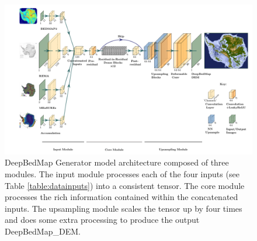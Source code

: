 \documentclass[tc, manuscript]{copernicus}
\begin{document}
\begin{figure}[htbp]
  \includegraphics[width=\textwidth]{figures/fig1_deepbedmap_architecture_compressed.pdf}
  \caption{
    DeepBedMap Generator model architecture composed of three modules.
    The input module processes each of the four inputs (see Table \ref{table:datainputs}) into a consistent tensor.
    The core module processes the rich information contained within the concatenated inputs.
    The upsampling module scales the tensor up by four times and does some extra processing to produce the output DeepBedMap\_DEM.
  }
  \label{fig:1}
\end{figure}
\end{document}
